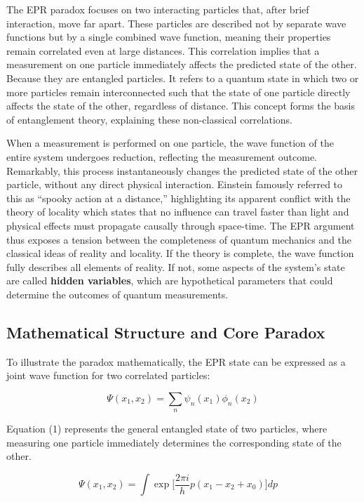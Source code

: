 \documentclass[17pt,a4paper]{extarticle}
\begin{document}
The EPR paradox focuses on two interacting particles that, after brief interaction, move far apart. These particles are described not by separate wave functions but by a single combined wave function, meaning their properties remain correlated even at large distances. This correlation implies that a measurement on one particle immediately affects the predicted state of the other. Because they are entangled particles. It refers to a quantum state in which two or more particles remain interconnected such that the state of one particle directly affects the state of the other, regardless of distance. This concept forms the basis of entanglement theory, explaining these non-classical correlations.

When a measurement is performed on one particle, the wave function of the entire system undergoes reduction, reflecting the measurement outcome. Remarkably, this process instantaneously changes the predicted state of the other particle, without any direct physical interaction. Einstein famously referred to this as ``spooky action at a distance,'' highlighting its apparent conflict with the theory of locality which states that no influence can travel faster than light and physical effects must propagate causally through space-time. The EPR argument thus exposes a tension between the completeness of quantum mechanics and the classical ideas of reality and locality. If the theory is complete, the wave function fully describes all elements of reality. If not, some aspects of the system’s state are called \textbf{hidden variables}, which are hypothetical parameters that could determine the outcomes of quantum measurements.

\subsection{Mathematical Structure and Core Paradox}

To illustrate the paradox mathematically, the EPR state can be expressed as a joint wave function for two correlated particles:

\begin{equation}
\Psi(x_1, x_2) = \sum_n \psi_n(x_1) \phi_n(x_2)
\end{equation}

Equation (1) represents the general entangled state of two particles, where measuring one particle immediately determines the corresponding state of the other.

\begin{equation}
\Psi(x_1, x_2) = \int \exp \Big[ \frac{2\pi i}{h} p (x_1 - x_2 + x_0) \Big] dp \quad
\end{equation}
\end{document}
